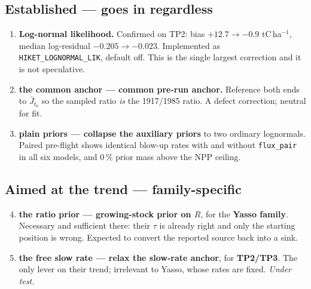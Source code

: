 \documentclass[11pt]{article}
\newcommand{\Jto}{\bar{J}_{t_0}}
\begin{document}
\subsection*{Established --- goes in regardless}
\begin{enumerate}
\item \textbf{Log-normal likelihood.} Confirmed on TP2: bias $+12.7 \rightarrow -0.9$
      tC\,ha$^{-1}$, median log-residual $-0.205 \rightarrow -0.023$. Implemented as
      \texttt{HIKET\_LOGNORMAL\_LIK}, default off. This is the single largest correction and it
      is not speculative.
\item \textbf{the common anchor --- common pre-run anchor.} Reference both ends to $\Jto$ so the sampled ratio
      \emph{is} the 1917/1985 ratio. A defect correction; neutral for fit.
\item \textbf{plain priors --- collapse the auxiliary priors} to two ordinary lognormals. Paired
      pre-flight shows identical blow-up rates with and without \texttt{flux\_pair} in all six
      models, and $0\,\%$ prior mass above the NPP ceiling.
\end{enumerate}

\subsection*{Aimed at the trend --- family-specific}
\begin{enumerate}\setcounter{enumi}{3}
\item \textbf{the ratio prior --- growing-stock prior on $R$}, for the \textbf{Yasso family}. Necessary and
      sufficient there: their $\tau$ is already right and only the starting position is wrong.
      Expected to convert the reported source back into a sink.
\item \textbf{the free slow rate --- relax the slow-rate anchor}, for \textbf{TP2/TP3}. The only lever on their
      trend; irrelevant to Yasso, whose rates are fixed. \emph{Under test.}
\end{enumerate}
\end{document}
